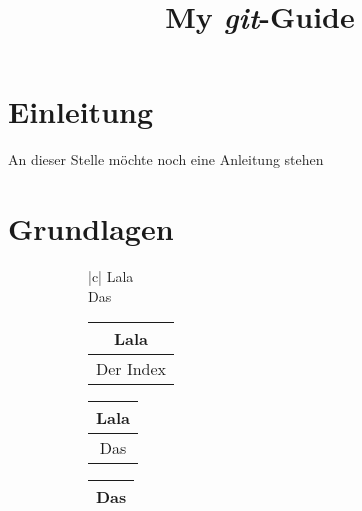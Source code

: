 
\usepackage{enumitem}
\usepackage{wasysym}
\title{My \emph{git}-Guide}

\maketitle
\tableofcontents
\newpage
\section{Einleitung}
An dieser Stelle möchte noch eine Anleitung stehen \smiley
\newpage

\section{Grundlagen}									%
\begin{figure}
\caption{Die drei Orte}
\begin{subfigure}{0.2\textwidth}
\begin{table}
	\begin{tabular*}{|c|}
	Lala\\
	\toprule
	Das\\
	\bottomrule
	\end{tabular*}
\end{table}
\end{subfigure}
\begin{subfigure}{0.2\textwidth}
\begin{table}
	\begin{tabular}{|c|}
	Lala\\
	\toprule
	Der Index\\
	\bottomrule
	\end{tabular}
\end{table}
\end{subfigure}
\begin{subfigure}{0.2\textwidth}
\begin{table}
	\begin{tabular}{|c|}
	Lala\\
	\toprule
	Das\\
	\bottomrule
	\end{tabular}
\end{table}
\end{subfigure}
\begin{subfigure}{0.2\textwidth}
\begin{table}
	\begin{tabular}{|c|}
	\toprule
	Das\\
	\bottomrule
	\end{tabular}
\end{table}
\end{subfigure}
\end{figure}
\newpage

